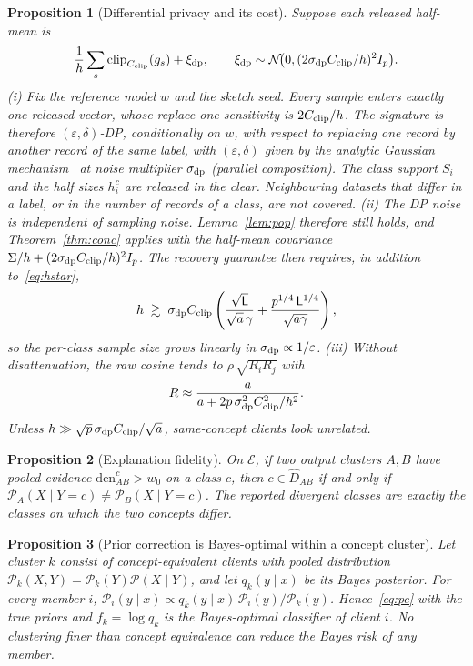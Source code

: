 \documentclass[pdflatex,sn-apa]{sn-jnl}
\theoremstyle{thmstyleone}
\newtheorem{proposition}{Proposition}
\theoremstyle{thmstylethree}
\newcommand{\cP}{\mathcal{P}}
\begin{document}
\begin{proposition}[Differential privacy and its cost]\label{prop:dp}
Suppose each released half-mean is
\[
\frac1h\sum_{s}\operatorname{clip}_{C_{\rm clip}}(g_s)+\xi_{\rm dp},
\qquad
\xi_{\rm dp}\sim\mathcal N\!\big(0,(2\sigma_{\rm dp}C_{\rm clip}/h)^2I_p\big).
\]
(i) Fix the reference model $w$ and the sketch seed. Every sample enters exactly one released vector, whose replace-one sensitivity is $2C_{\rm clip}/h$. The signature is therefore $(\varepsilon,\delta)$-DP, conditionally on $w$, with respect to replacing one record by another record \emph{of the same label}, with $(\varepsilon,\delta)$ given by the analytic Gaussian mechanism~\citep{balle2018analytic} at noise multiplier $\sigma_{\rm dp}$ (parallel composition). The class support $S_i$ and the half sizes $h_i^c$ are released in the clear. Neighbouring datasets that differ in a label, or in the number of records of a class, are not covered.
(ii) The DP noise is independent of sampling noise. Lemma~\ref{lem:pop} therefore still holds, and Theorem~\ref{thm:conc} applies with the half-mean covariance $\Sigma/h+(2\sigma_{\rm dp}C_{\rm clip}/h)^2I_p$. The recovery guarantee then requires, in addition to~\eqref{eq:hstar},
\[
h\;\gtrsim\;\sigma_{\rm dp}C_{\rm clip}\left(\frac{\sqrt{\mathsf L}}{\sqrt a\,\gamma}+\frac{p^{1/4}\,\mathsf L^{1/4}}{\sqrt{a\gamma}}\right),
\]
so the per-class sample size grows linearly in $\sigma_{\rm dp}\propto1/\varepsilon$.
(iii) Without disattenuation, the raw cosine tends to $\rho\,\sqrt{R_iR_j}$ with
\[
R\approx\frac{a}{a+2p\,\sigma^2_{\rm dp}C_{\rm clip}^2/h^2}.
\]
Unless $h\gg\sqrt p\,\sigma_{\rm dp}C_{\rm clip}/\sqrt a$, same-concept clients look unrelated.
\end{proposition}

\begin{proposition}[Explanation fidelity]\label{prop:expl}
On $\mathcal E$, if two output clusters $A,B$ have pooled evidence $\mathrm{den}^c_{AB}>w_0$ on a class $c$, then $c\in\hat D_{AB}$ if and only if $\cP_A(X\mid Y=c)\neq\cP_B(X\mid Y=c)$. The reported divergent classes are exactly the classes on which the two concepts differ.
\end{proposition}

\begin{proposition}[Prior correction is Bayes-optimal within a concept cluster]\label{prop:pc}
Let cluster $k$ consist of concept-equivalent clients with pooled distribution $\cP_k(X,Y)=\cP_k(Y)\cP(X\mid Y)$, and let $q_k(y\mid x)$ be its Bayes posterior. For every member $i$, $\cP_i(y\mid x)\propto q_k(y\mid x)\,\cP_i(y)/\cP_k(y)$. Hence~\eqref{eq:pc} with the true priors and $f_k=\log q_k$ is the Bayes-optimal classifier of client $i$. No clustering finer than concept equivalence can reduce the Bayes risk of any member.
\end{proposition}
\end{document}
